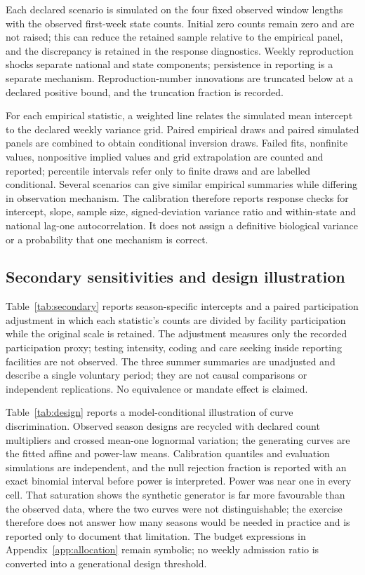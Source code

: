 Each declared scenario is simulated on the four fixed observed window lengths with the observed first-week state counts. Initial zero counts remain zero and are not raised; this can reduce the retained sample relative to the empirical panel, and the discrepancy is retained in the response diagnostics. Weekly reproduction shocks separate national and state components; persistence in reporting is a separate mechanism. Reproduction-number innovations are truncated below at a declared positive bound, and the truncation fraction is recorded.

For each empirical statistic, a weighted line relates the simulated mean intercept to the declared weekly variance grid. Paired empirical draws and paired simulated panels are combined to obtain conditional inversion draws. Failed fits, nonfinite values, nonpositive implied values and grid extrapolation are counted and reported; percentile intervals refer only to finite draws and are labelled conditional. Several scenarios can give similar empirical summaries while differing in observation mechanism. The calibration therefore reports response checks for intercept, slope, sample size, signed-deviation variance ratio and within-state and national lag-one autocorrelation. It does not assign a definitive biological variance or a probability that one mechanism is correct.

\subsection{Secondary sensitivities and design illustration}
\label{app:secondary}

Table~\ref{tab:secondary} reports season-specific intercepts and a paired participation adjustment in which each statistic's counts are divided by facility participation while the original scale is retained. The adjustment measures only the recorded participation proxy; testing intensity, coding and care seeking inside reporting facilities are not observed. The three summer summaries are unadjusted and describe a single voluntary period; they are not causal comparisons or independent replications. No equivalence or mandate effect is claimed.

Table~\ref{tab:design} reports a model-conditional illustration of curve discrimination. Observed season designs are recycled with declared count multipliers and crossed mean-one lognormal variation; the generating curves are the fitted affine and power-law means. Calibration quantiles and evaluation simulations are independent, and the null rejection fraction is reported with an exact binomial interval before power is interpreted. Power was near one in every cell. That saturation shows the synthetic generator is far more favourable than the observed data, where the two curves were not distinguishable; the exercise therefore does not answer how many seasons would be needed in practice and is reported only to document that limitation. The budget expressions in Appendix~\ref{app:allocation} remain symbolic; no weekly admission ratio is converted into a generational design threshold.









